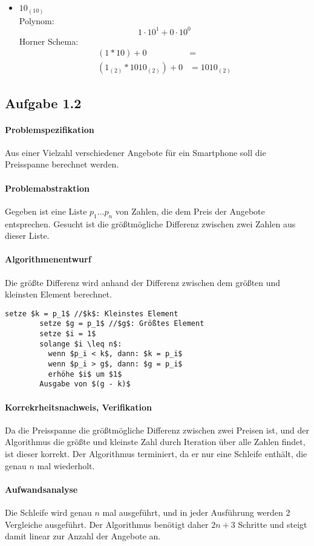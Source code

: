 \documentclass{article}
\begin{document}
\begin{itemize}
\begin{equation}
          \end{equation}
        \item $10_{(10)}$\\
        Polynom:
        \begin{equation}
          1 \cdot 10^1 + 0 \cdot10^0
        \end{equation}
        Horner Schema:
          \begin{equation}
            \begin{aligned}
              (1 * 10) + 0 &=\\
              (1_{(2)} * 1010_{(2)}) + 0 &= 1010_{(2)}
            \end{aligned}
          \end{equation}
      \end{itemize}
    \subsection{Aufgabe 1.2}
      \paragraph{Problemspezifikation} Aus einer Vielzahl verschiedener Angebote
        für ein Smartphone soll die Preisspanne berechnet werden.
      \paragraph{Problemabstraktion} Gegeben ist eine Liste $p_1 \ldots p_n$ von
        Zahlen, die dem Preis der Angebote entsprechen. Gesucht ist die
        größtmögliche Differenz zwischen zwei Zahlen aus dieser Liste.
      \paragraph{Algorithmenentwurf} Die größte Differenz wird anhand der
      Differenz zwischen dem größten und kleinsten Element berechnet.\\
      \begin{lstlisting}[mathescape=true]
        setze $k = p_1$ //$k$: Kleinstes Element
        setze $g = p_1$ //$g$: Größtes Element
        setze $i = 1$
        solange $i \leq n$:
          wenn $p_i < k$, dann: $k = p_i$
          wenn $p_i > g$, dann: $g = p_i$
          erhöhe $i$ um $1$
        Ausgabe von $(g - k)$
      \end{lstlisting}
      \paragraph{Korrekrheitsnachweis, Verifikation} Da die Preisspanne die
        größtmögliche Differenz zwischen zwei Preisen ist, und der Algorithmus
        die größte und kleinste Zahl durch Iteration über alle Zahlen findet,
        ist dieser korrekt. Der Algorithmus terminiert, da er nur eine Schleife
        enthält, die genau $n$ mal wiederholt.
      \paragraph{Aufwandsanalyse} Die Schleife wird genau $n$ mal ausgeführt,
      und in jeder Ausführung werden 2 Vergleiche ausgeführt. Der Algorithmus
      benötigt daher $2n+3$ Schritte und steigt damit linear zur Anzahl der
      Angebote an.
\end{document}
